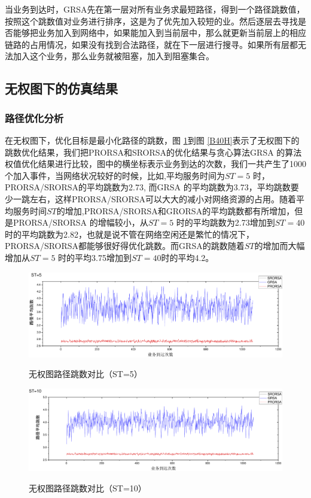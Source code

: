 当业务到达时，GRSA先在第一层对所有业务求最短路径，得到一个路径跳数值，按照这个跳数值对业务进行排序，这是为了优先加入较短的业。然后逐层去寻找是否能够把业务加入到网络中，如果能加入到当前层中，那么就更新当前层上的相应链路的占用情况，如果没有找到合法路径，就在下一层进行搜寻。如果所有层都无法加入这个业务，那么业务就被阻塞，加入到阻塞集合。
\subsection{无权图下的仿真结果}
\subsubsection{路径优化分析}

在无权图下，优化目标是最小化路径的跳数，图 \ref{B5H}到图 \ref{B40H}表示了无权图下的跳数优化结果，我们把PRORSA和SRORSA的优化结果与贪心算法GRSA 的算法权值优化结果进行比较，图中的横坐标表示业务到达的次数，我们一共产生了1000个加入事件，当网络状况较好的时候，比如,平均服务时间为$ST=5$ 时，PRORSA/SRORSA的平均跳数为2.73, 而GRSA 的平均跳数为3.73，平均跳数要少一跳左右，这样PRORSA/SRORSA可以大大的减小对网络资源的占用。随着平均服务时间$ST$的增加,PRORSA/SRORSA和GRORSA的平均跳数都有所增加，但是PRORSA/SRORSA 的增幅较小，从$ST=5$ 时的平均跳数为2.73增加到$ST=40$时的平均跳数为2.82，也就是说不管在网络空闲还是繁忙的情况下，PRORSA/SRORSA都能够很好得优化跳数。而GRSA的跳数随着$ST$的增加而大幅增加从$ST=5$ 时的平均3.75增加到$ST=40$时的平均4.2。
\begin{figure}
\setlength{\belowcaptionskip}{-0.5cm}
\begin{center}
{\includegraphics[width=1 \textwidth]{figures/B5H.pdf}}
\end{center}
\caption{{\footnotesize{无权图路径跳数对比（ST=5）}}}
\label{B5H}
\end{figure}
\begin{figure}
\setlength{\belowcaptionskip}{-0.5cm}
\begin{center}
{\includegraphics[width=1 \textwidth]{figures/B10H.pdf}}
\end{center}
\caption{{\footnotesize{无权图路径跳数对比（ST=10）}}}
\label{B10H}
\end{figure}
